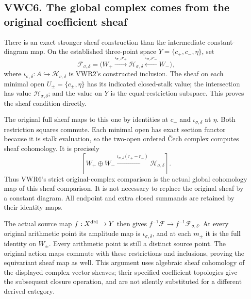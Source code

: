 \subsection{VWC6. The global complex comes from the original coefficient
sheaf}\label{vwc6.-the-global-complex-comes-from-the-original-coefficient-sheaf}

There is an exact stronger sheaf construction than the intermediate
constant-diagram map. On the established three-point space
\(Y=\{c_+,c_-,\eta\}\), set \[
\mathcal F_{\sigma,\delta}
=\bigl(W_+\xrightarrow{\iota_{\sigma,\delta}r_+}
   \mathcal H_{\sigma,\delta}
   \xleftarrow{\iota_{\sigma,\delta}r_-}W_-\bigr),
\] where
\(\iota_{\sigma,\delta}:A\hookrightarrow\mathcal H_{\sigma,\delta}\) is
VWR2's constructed inclusion. The sheaf on each minimal open
\(U_\pm=\{c_\pm,\eta\}\) has its indicated closed-stalk value; the
intersection has value \(\mathcal H_{\sigma,\delta}\); and the value on
\(Y\) is the equal-restriction subspace. This proves the sheaf condition
directly.

The original full sheaf maps to this one by identities at \(c_\pm\) and
\(\iota_{\sigma,\delta}\) at \(\eta\). Both restriction squares commute.
Each minimal open has exact section functor because it is stalk
evaluation, so the two-open ordered Čech complex computes sheaf
cohomology. It is precisely \[
[W_+\oplus W_-\xrightarrow{\iota_{\sigma,\delta}(r_+-r_-)}
  \mathcal H_{\sigma,\delta}].
\] Thus VWR6's strict original-complex comparison is the actual global
cohomology map of this sheaf comparison. It is not necessary to replace
the original sheaf by a constant diagram. All endpoint and extra closed
summands are retained by their identity maps.

The actual source map \(f:X^{\rm dbl}\to Y\) then gives
\(f^{-1}\mathcal F\to f^{-1}\mathcal F_{\sigma,\delta}\). At every
original arithmetic point its amplitude map is
\(\iota_{\sigma,\delta}\), and at each \(m_\pm\) it is the full identity
on \(W_\pm\). Every arithmetic point is still a distinct source point.
The original action maps commute with these restrictions and inclusions,
proving the equivariant sheaf map as well. This argument uses algebraic
sheaf cohomology of the displayed complex vector sheaves; their
specified coefficient topologies give the subsequent closure operation,
and are not silently substituted for a different derived category.

